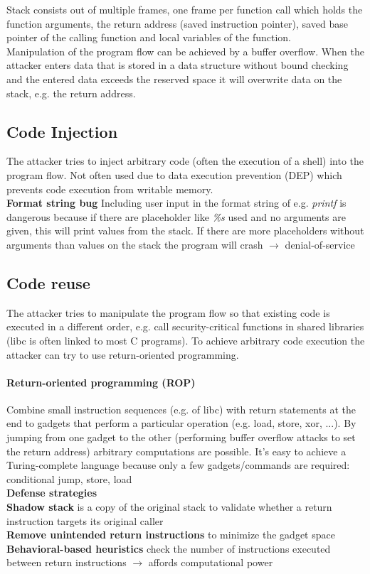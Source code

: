 \documentclass[12pt]{article}
\begin{document}
	Stack consists out of multiple frames, one frame per function call which holds the function arguments, the return address (saved instruction pointer), saved base pointer of the calling function and local variables of the function.\\
	Manipulation of the program flow can be achieved by a buffer overflow. When the attacker enters data that is stored in a data structure without bound checking and the entered data exceeds the reserved space it will overwrite data on the stack, e.g. the return address.
	
	\subsection{Code Injection}
	The attacker tries to inject arbitrary code (often the execution of a shell) into the program flow. Not often used due to data execution prevention (DEP) which prevents code execution from writable memory.\\
	\textbf{Format string bug} Including user input in the format string of e.g. \textit{printf} is dangerous because if there are placeholder like\textit{ \%s} used and no arguments are given, this will print values from the stack. If there are more placeholders without arguments than values on the stack the program will crash $\rightarrow$ denial-of-service
	
	\subsection{Code reuse} The attacker tries to manipulate the program flow so that existing code is executed in a different order, e.g. call security-critical functions in shared libraries (libc is often linked to most C programs). To achieve arbitrary code execution the attacker can try to use return-oriented programming.
	
	\paragraph{Return-oriented programming (ROP)} Combine small instruction sequences (e.g. of libc) with return statements at the end to gadgets that perform a particular operation (e.g. load, store, xor, ...). By jumping from one gadget to the other (performing buffer overflow attacks to set the return address) arbitrary computations are possible. It's easy to achieve a Turing-complete language because only a few gadgets/commands are required: conditional jump, store, load\\
	\textbf{Defense strategies}\\
	\textbf{Shadow stack} is a copy of the original stack to validate whether a return instruction targets its original caller\\
	\textbf{Remove unintended return instructions} to minimize the gadget space\\
	\textbf{Behavioral-based heuristics} check the number of instructions executed between return instructions $\rightarrow$ affords computational power
	
\end{document}
